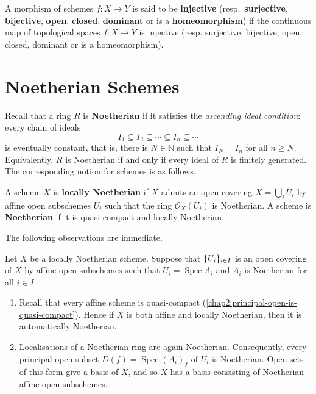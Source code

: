 \documentclass[12pt]{book}
\newcommand{\inlinedef}[1]{\textcolor{oxfordblue}{\bfseries #1}}
\theoremstyle{definition}
\DeclarePairedDelimiter{\Set}{\lbrace}{\rbrace}
\newcommand{\NN}{\mathbb N}
\DeclareMathOperator{\Spec}{Spec}
\begin{document}
	\begin{definition}
		A morphism of schemes $f \colon X \to Y$ is said to be \inlinedef{injective} (resp.~\inlinedef{surjective}, \inlinedef{bijective}, \inlinedef{open}, \inlinedef{closed}, \inlinedef{dominant} or is a \inlinedef{homeomorphism}) if the continuous map of topological spaces $f \colon X \to Y$ is injective (resp. surjective, bijective, open, closed, dominant or is a homeomorphism).
	\end{definition}
	
	\section{Noetherian Schemes}
	
	Recall that a ring $R$ is \inlinedef{Noetherian} if it satisfies the \textit{ascending ideal condition}: every chain of ideals
	\begin{equation*}
		I_1 \subseteq I_2 \subseteq \dotsb \subseteq I_n \subseteq \dotsb
	\end{equation*}
	is eventually constant, that is, there is $N \in \NN$ such that $I_N = I_n$ for all $n \geq N$. Equivalently, $R$ is Noetherian if and only if every ideal of $R$ is finitely generated. The corresponding notion for schemes is as follows.
	
	\begin{definition}
		A scheme $X$ is \inlinedef{locally Noetherian} if $X$ admits an open covering $X = \bigcup_i U_i$ by affine open subschemes $U_i$ such that the ring $\mathcal{O}_X(U_i)$ is Noetherian. A scheme is \inlinedef{Noetherian} if it is quasi-compact and locally Noetherian.
	\end{definition}
	
	The following observations are immediate.
	\begin{remark}\label{chap5:remark-noetherian}
		Let $X$ be a locally Noetherian scheme. Suppose that $\Set{U_i}_{i\in I}$ is an open covering of $X$ by affine open subschemes such that $U_i = \Spec A_i$ and $A_i$ is Noetherian for all $i \in I$.
		\begin{enumerate}
			\item Recall that every affine scheme is quasi-compact (\cref{chap2:principal-open-is-quasi-compact}). Hence if $X$ is both affine and locally Noetherian, then it is automatically Noetherian.
			
			\item Localisations of a Noetherian ring are again Noetherian. Consequently, every principal open subset $D(f) = \Spec (A_i)_{f}$ of $U_i$ is Noetherian. Open sets of this form give a basis of $X$, and so $X$ has a basis consisting of Noetherian affine open subschemes.
		\end{enumerate}
	\end{remark}
	
\end{document}
